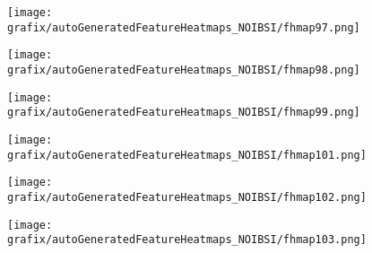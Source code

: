 \begin{subfigure}{\wid\textwidth} 
    \centering 
    \caption{\tiny \sffamily {}} 
    \vspace{\vsp} 
    \texttt{[image: grafix/autoGeneratedFeatureHeatmaps\_NOIBSI/fhmap97.png]} 
\end{subfigure} 
\hspace{\hsp} 
\begin{subfigure}{\wid\textwidth} 
    \centering 
    \caption{\tiny \sffamily {}} 
    \vspace{\vsp} 
    \texttt{[image: grafix/autoGeneratedFeatureHeatmaps\_NOIBSI/fhmap98.png]} 
\end{subfigure} 
\hspace{\hsp} 
\begin{subfigure}{\wid\textwidth} 
    \centering 
    \caption{\tiny \sffamily {}} 
    \vspace{\vsp} 
    \texttt{[image: grafix/autoGeneratedFeatureHeatmaps\_NOIBSI/fhmap99.png]} 
\end{subfigure} 
\hspace{\hsp} 
\begin{subfigure}{\wid\textwidth} 
    \centering 
    \caption{\small \sffamily {}} 
\end{subfigure} 
\hspace{\hsp} 
\begin{subfigure}{\wid\textwidth} 
    \centering 
    \caption{\tiny \sffamily {}} 
    \vspace{\vsp} 
    \texttt{[image: grafix/autoGeneratedFeatureHeatmaps\_NOIBSI/fhmap101.png]} 
\end{subfigure} 
\hspace{\hsp} 
\begin{subfigure}{\wid\textwidth} 
    \centering 
    \caption{\tiny \sffamily {}} 
    \vspace{\vsp} 
    \texttt{[image: grafix/autoGeneratedFeatureHeatmaps\_NOIBSI/fhmap102.png]} 
\end{subfigure} 
\hspace{\hsp} 
\begin{subfigure}{\wid\textwidth} 
    \centering 
    \caption{\tiny \sffamily {}} 
    \vspace{\vsp} 
    \texttt{[image: grafix/autoGeneratedFeatureHeatmaps\_NOIBSI/fhmap103.png]} 
\end{subfigure} 
